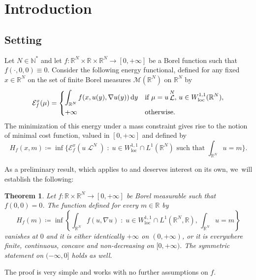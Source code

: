 \documentclass[10pt]{amsart}
\theoremstyle{plain}
\newtheorem{theorem}{Theorem}[section]
\theoremstyle{definition}
\newcommand{\dd}{\mathop{}\mathopen{}\mathrm{d}}
\newcommand{\N}{\mathbb{N}}
\newcommand{\R}{\mathbb{R}}
\newcommand{\Mspace}{\mathscr{M}}
\newcommand{\ener}{\mathcal{E}}
\newcommand{\loc}{\mathrm{loc}}
\newcommand{\st}{\;:\;}
\DeclareMathOperator{\lbm}{\mathcal{L}}
\begin{document}
\section{Introduction}\label{sectionIntroduction}

\subsection{Setting}

Let \(N\in\N^\ast\) and let \(f:\R^N\times\R\times\R^N\to[0,+\infty]\) be a Borel function such that $f(\cdot,0,0) \equiv 0$. Consider the following energy functional, defined for any fixed \(x\in\R^N\) on the set of finite Borel measures \(\Mspace(\R^N)\) on \(\R^N\) by
\begin{equation}\label{def_ener}
\ener^x_f(\mu)=
\begin{dcases}
\int_{\R^N} f(x,u(y),\nabla u(y))\dd y &\text{if } \mu = u\lbm^N,\, u\in W^{1,1}_\loc(\R^N),\\
+\infty&\text{otherwise.}
\end{dcases}
\end{equation}
The minimization of this energy under a mass constraint gives rise to the notion of minimal cost function, valued in $[0,+\infty]$ and defined by
\begin{equation}\label{def_Hf}
H_f(x,m) \coloneqq \inf\biggl\{\ener^x_f(u\lbm^N) \st u \in W^{1,1}_\loc\cap L^1(\R^N) \text{ such that } \int_{\R^N} u = m\biggr\}.
\end{equation}

As a preliminary result, which applies to  and deserves interest on its own, we~will establish the following:
\begin{theorem}\label{concaveDN}
Let $f :\R\times \R^N \to [0,+\infty]$ be Borel measurable such that $f(0,0) = 0$. The function defined for every $m\in \R$ by
\begin{equation}\label{PropertiesDefinitionH}
H_f(m) \coloneqq \inf\left\{\int_{\R^N}f(u,\nabla u)\st u\in W^{1,1}_\loc\cap L^1(\R^N,\R),\,\int_{\R^N}u=m\right\}
\end{equation}
vanishes at $0$ and it is either identically $+\infty$ on $(0,+\infty)$, or it is everywhere finite, continuous, concave and non-decreasing on \([0,+\infty)\). The symmetric statement on $(-\infty,0]$ holds as well.
\end{theorem}
\noindent The proof is very simple and works with no further assumptions on \(f\).
\end{document}
